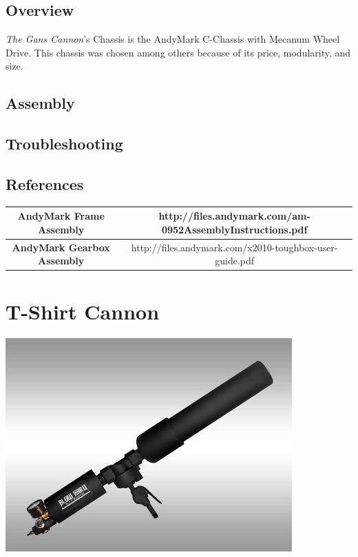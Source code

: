 \documentclass[letterpaper,12pt]{article}
\newcommand{\botname}{\textit{The Gans Cannon}}
\begin{document}
\subsection{Overview}
\botname's Chassis is the AndyMark C-Chassis with Mecanum Wheel Drive. This chassis was chosen among others because of its price, modularity, and size.

\subsection{Assembly}
\subsection{Troubleshooting}
\subsection{References}

\begin{table}[h!]
  \begin{tabular}{| c | c |}
    \hline
    \textbf{AndyMark Frame Assembly} &  http://files.andymark.com/am-0952AssemblyInstructions.pdf\\
    \hline
    \textbf{AndyMark Gearbox Assembly} &  http://files.andymark.com/x2010-toughbox-user-guide.pdf\\
    \hline
  \end{tabular}
  \label{tab:fire_cmd_msg}
\end{table}

\section{T-Shirt Cannon}
\begin{center}
    \includegraphics[width=11cm]{pics/cannon/blowhard_cannon.jpg}
\end{center}
\end{document}
